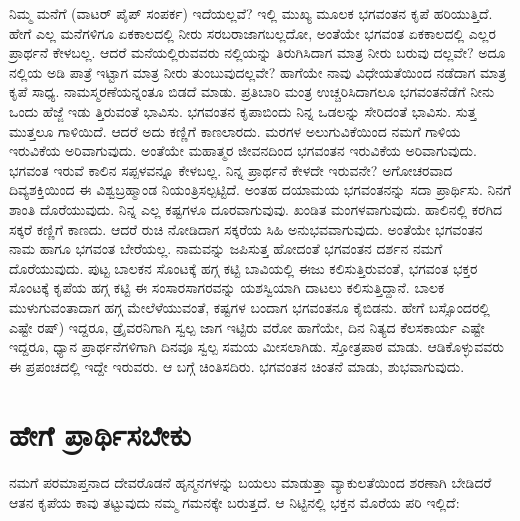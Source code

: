 ನಿಮ್ಮ ಮನೆಗೆ  (ವಾಟರ್ ಪೈಪ್ ಸಂಪರ್ಕ) ಇದೆಯಲ್ಲವೆ? ಇಲ್ಲಿ ಮುಖ್ಯ  ಮೂಲಕ ಭಗವಂತನ ಕೃಪೆ ಹರಿಯುತ್ತಿದೆ. ಹೇಗೆ ಎಲ್ಲ ಮನೆಗಳಿಗೂ ಏಕಕಾಲದಲ್ಲಿ ನೀರು ಸರಬರಾಜಾಗಬಲ್ಲದೋ, ಅಂತೆಯೇ ಭಗವಂತ ಏಕಕಾಲದಲ್ಲಿ ಎಲ್ಲರ ಪ್ರಾರ್ಥನೆ ಕೇಳಬಲ್ಲ. ಆದರೆ ಮನೆಯಲ್ಲಿರುವವರು ನಲ್ಲಿಯನ್ನು ತಿರುಗಿಸಿದಾಗ ಮಾತ್ರ ನೀರು ಬರುವು ದಲ್ಲವೇ? ಅದೂ ನಲ್ಲಿಯ ಅಡಿ ಪಾತ್ರೆ ಇಟ್ಟಾಗ ಮಾತ್ರ ನೀರು ತುಂಬುವುದಲ್ಲವೇ? ಹಾಗೆಯೇ ನಾವು ವಿಧೇಯತೆಯಿಂದ ನಡೆದಾಗ ಮಾತ್ರ ಕೃಪೆ ಸಾಧ್ಯ. ನಾಮಸ್ಮರಣೆಯನ್ನಂತೂ ಬಿಡದೆ ಮಾಡು. ಪ್ರತಿಬಾರಿ ಮಂತ್ರ ಉಚ್ಚರಿಸಿದಾಗಲೂ ಭಗವಂತನೆಡೆಗೆ ನೀನು ಒಂದು ಹೆಜ್ಜೆ ಇಡು ತ್ತಿರುವಂತೆ ಭಾವಿಸು. ಭಗವಂತನ ಕೃಪಾಬಿಂದು ನಿನ್ನ ಒಡಲನ್ನು ಸೇರಿದಂತೆ ಭಾವಿಸು. ಸುತ್ತ ಮುತ್ತಲೂ ಗಾಳಿಯಿದೆ. ಆದರೆ ಅದು ಕಣ್ಣಿಗೆ ಕಾಣಲಾರದು. ಮರಗಳ ಅಲುಗುವಿಕೆಯಿಂದ ನಮಗೆ ಗಾಳಿಯ ಇರುವಿಕೆಯ ಅರಿವಾಗುವುದು. ಅಂತೆಯೇ ಮಹಾತ್ಮರ ಜೀವನದಿಂದ ಭಗವಂತನ ಇರುವಿಕೆಯ ಅರಿವಾಗುವುದು. ಭಗವಂತ ಇರುವೆ ಕಾಲಿನ ಸಪ್ಪಳವನ್ನೂ ಕೇಳಬಲ್ಲ. ನಿನ್ನ ಪ್ರಾರ್ಥನೆ ಕೇಳದೇ ಇರುವನೇ? ಅಗೋಚರವಾದ ದಿವ್ಯಶಕ್ತಿಯಿಂದ ಈ ವಿಶ್ವಬ್ರಹ್ಮಾಂಡ ನಿಯಂತ್ರಿಸಲ್ಪಟ್ಟಿದೆ. ಅಂತಹ ದಯಾಮಯ ಭಗವಂತನನ್ನು ಸದಾ ಪ್ರಾರ್ಥಿಸು. ನಿನಗೆ ಶಾಂತಿ ದೊರೆಯುವುದು. ನಿನ್ನ ಎಲ್ಲ ಕಷ್ಟಗಳೂ ದೂರವಾಗುವುವು. ಖಂಡಿತ ಮಂಗಳವಾಗುವುದು. ಹಾಲಿನಲ್ಲಿ ಕರಗಿದ ಸಕ್ಕರೆ ಕಣ್ಣಿಗೆ ಕಾಣದು. ಆದರೆ ರುಚಿ ನೋಡಿದಾಗ ಸಕ್ಕರೆಯ ಸಿಹಿ ಅನುಭವವಾಗುವುದು. ಅಂತೆಯೇ ಭಗವಂತನ ನಾಮ ಹಾಗೂ ಭಗವಂತ ಬೇರೆಯಲ್ಲ. ನಾಮವನ್ನು ಜಪಿಸುತ್ತ ಹೋದಂತೆ ಭಗವಂತನ ದರ್ಶನ ನಮಗೆ ದೊರೆಯುವುದು. ಪುಟ್ಟ ಬಾಲಕನ ಸೊಂಟಕ್ಕೆ ಹಗ್ಗ ಕಟ್ಟಿ ಬಾವಿಯಲ್ಲಿ ಈಜು ಕಲಿಸುತ್ತಿರುವಂತೆ, ಭಗವಂತ ಭಕ್ತರ ಸೊಂಟಕ್ಕೆ ಕೃಪೆಯ ಹಗ್ಗ ಕಟ್ಟಿ ಈ ಸಂಸಾರಸಾಗರವನ್ನು ಯಶಸ್ವಿಯಾಗಿ ದಾಟಲು ಕಲಿಸುತ್ತಿದ್ದಾನೆ. ಬಾಲಕ ಮುಳುಗುವಂತಾದಾಗ ಹಗ್ಗ ಮೇಲೆಳೆಯುವಂತೆ, ಕಷ್ಟಗಳ ಬಂದಾಗ ಭಗವಂತನೂ ಕೈಬಿಡನು. ಹೇಗೆ ಬಸ್ಸೊಂದರಲ್ಲಿ ಎಷ್ಟೇ ರಷ್​) ಇದ್ದರೂ, ಡ್ರೈವರನಿಗಾಗಿ ಸ್ವಲ್ಪ ಜಾಗ ಇಟ್ಟಿರು ವರೋ ಹಾಗೆಯೇ, ದಿನ ನಿತ್ಯದ ಕೆಲಸಕಾರ್ಯ ಎಷ್ಟೇ ಇದ್ದರೂ, ಧ್ಯಾನ ಪ್ರಾರ್ಥನೆಗಳಿಗಾಗಿ ದಿನವೂ ಸ್ವಲ್ಪ ಸಮಯ ಮೀಸಲಾಗಿಡು. ಸ್ತೋತ್ರಪಾಠ ಮಾಡು. ಆಡಿಕೊಳ್ಳುವವರು ಈ ಪ್ರಪಂಚದಲ್ಲಿ ಇದ್ದೇ ಇರುವರು. ಆ ಬಗ್ಗೆ ಚಿಂತಿಸದಿರು. ಭಗವಂತನ ಚಿಂತನೆ ಮಾಡು, ಶುಭವಾಗುವುದು.


\section*{ಹೇಗೆ ಪ್ರಾರ್ಥಿಸಬೇಕು}


ನಮಗೆ ಪರಮಾಪ್ತನಾದ ದೇವರೊಡನೆ ಹೃನ್ಮನಗಳನ್ನು ಬಯಲು ಮಾಡುತ್ತಾ ವ್ಯಾಕುಲತೆಯಿಂದ ಶರಣಾಗಿ ಬೇಡಿದರೆ ಆತನ ಕೃಪೆಯ ಕಾವು ತಟ್ಟುವುದು ನಮ್ಮ ಗಮನಕ್ಕೇ ಬರುತ್ತದೆ. ಆ ನಿಟ್ಟಿನಲ್ಲಿ ಭಕ್ತನ ಮೊರೆಯ ಪರಿ ಇಲ್ಲಿದೆ:

\vskip 2pt

